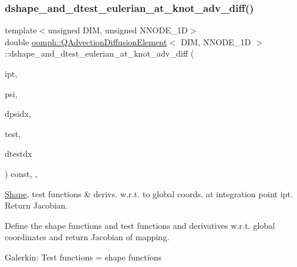 \mbox{\label{classoomph_1_1QAdvectionDiffusionElement_afc66bf00b79622cc6580787b9d86f215}} 
\subsubsection{\texorpdfstring{dshape\+\_\+and\+\_\+dtest\+\_\+eulerian\+\_\+at\+\_\+knot\+\_\+adv\+\_\+diff()}{dshape\_and\_dtest\_eulerian\_at\_knot\_adv\_diff()}}
{\footnotesize\ttfamily template$<$unsigned D\+IM, unsigned N\+N\+O\+D\+E\+\_\+1D$>$ \\
double \hyperlink{classoomph_1_1QAdvectionDiffusionElement}{oomph\+::\+Q\+Advection\+Diffusion\+Element}$<$ D\+IM, N\+N\+O\+D\+E\+\_\+1D $>$\+::dshape\+\_\+and\+\_\+dtest\+\_\+eulerian\+\_\+at\+\_\+knot\+\_\+adv\+\_\+diff (\begin{DoxyParamCaption}\item[{const unsigned \&}]{ipt,  }\item[{\hyperlink{classoomph_1_1Shape}{Shape} \&}]{psi,  }\item[{\hyperlink{classoomph_1_1DShape}{D\+Shape} \&}]{dpsidx,  }\item[{\hyperlink{classoomph_1_1Shape}{Shape} \&}]{test,  }\item[{\hyperlink{classoomph_1_1DShape}{D\+Shape} \&}]{dtestdx }\end{DoxyParamCaption}) const\hspace{0.3cm}{\ttfamily [inline]}, {\ttfamily [protected]}, {\ttfamily [virtual]}}



\hyperlink{classoomph_1_1Shape}{Shape}, test functions \& derivs. w.\+r.\+t. to global coords. at integration point ipt. Return Jacobian. 

Define the shape functions and test functions and derivatives w.\+r.\+t. global coordinates and return Jacobian of mapping.

Galerkin\+: Test functions = shape functions 

